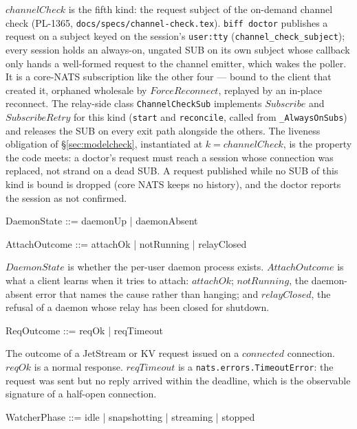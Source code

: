 \documentclass[a4paper,10pt,fleqn]{article}
\begin{document}
$channelCheck$ is the fifth kind: the request subject of the on-demand
channel check (PL-1365, \texttt{docs/specs/channel-check.tex}).  \texttt{biff doctor}
publishes a request on a subject keyed on the session's \texttt{user:tty}
(\texttt{channel\_check\_subject}); every session holds an always-on, ungated
SUB on its own subject whose callback only hands a well-formed request to the
channel emitter, which wakes the poller.  It is a core-NATS subscription like
the other four --- bound to the client that created it, orphaned wholesale by
$ForceReconnect$, replayed by an in-place reconnect.  The relay-side class
\texttt{ChannelCheckSub} implements $Subscribe$ and $SubscribeRetry$ for this
kind (\texttt{start} and \texttt{reconcile}, called from
\texttt{\_AlwaysOnSubs}) and releases the SUB on every exit path alongside
the others.  The liveness obligation of \S\ref{sec:modelcheck}, instantiated
at $k = channelCheck$, is the property the code meets: a doctor's request must
reach a session whose connection was replaced, not strand on a dead SUB.  A
request published while no SUB of this kind is bound is dropped (core NATS keeps
no history), and the doctor reports the session as not confirmed.

\begin{zed}
  DaemonState ::= daemonUp | daemonAbsent
\end{zed}

\begin{zed}
  AttachOutcome ::= attachOk | notRunning | relayClosed
\end{zed}

$DaemonState$ is whether the per-user daemon process exists.
$AttachOutcome$ is what a client learns when it tries to attach:
$attachOk$; $notRunning$, the daemon-absent error that names the cause
rather than hanging; and $relayClosed$, the refusal of a daemon whose
relay has been closed for shutdown.

\begin{zed}
  ReqOutcome ::= reqOk | reqTimeout
\end{zed}

The outcome of a JetStream or KV request issued on a $connected$
connection.  $reqOk$ is a normal response.  $reqTimeout$ is a
\texttt{nats.errors.TimeoutError}: the request was sent but no
reply arrived within the deadline, which is the observable
signature of a half-open connection.

\begin{zed}
  WatcherPhase ::= idle | snapshotting | streaming | stopped
\end{zed}
\end{document}
